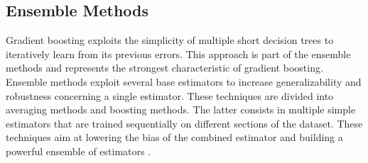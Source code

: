 \documentclass[../../Thesis.tex]{subfiles}
\begin{document}
	 	\subsection{Ensemble Methods}
	 		Gradient boosting exploits the simplicity of multiple short decision trees to iteratively learn from its previous errors. This approach is part of the ensemble methods and represents the strongest characteristic of gradient boosting. 
	 		Ensemble methods exploit several base estimators to increase generalizability and robustness concerning a single estimator.  These techniques are divided into averaging methods and boosting methods. The latter consists in multiple simple estimators that are trained sequentially on different sections of the dataset. These techniques aim at lowering the bias of the combined estimator and building a powerful ensemble of estimators \cite{Freund1997}. 
	 			 		
\end{document}
